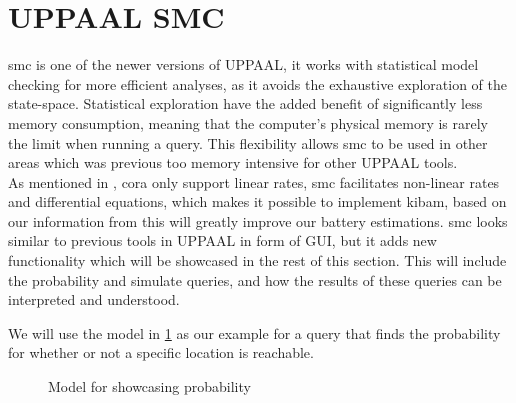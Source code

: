 \section{UPPAAL SMC} \label{sec:smc}
\gls{smc} is one of the newer versions of UPPAAL, it works with statistical model checking for more efficient analyses, as it avoids the exhaustive exploration of the state-space.
Statistical exploration have the added benefit of significantly less memory consumption, meaning that the computer's physical memory is rarely the limit when running a query.
This flexibility allows \gls{smc} to be used in other areas which was previous too memory intensive for other UPPAAL tools\cite{cs_smc}.\\
As mentioned in , \gls{cora} only support linear rates, \gls{smc} facilitates non-linear rates and differential equations, which makes it possible to implement \gls{kibam}, based on our information from  this will greatly improve our battery estimations.
\gls{smc} looks similar to previous tools in UPPAAL in form of GUI, but it adds new functionality which will be showcased in the rest of this section.
This will include the probability and simulate queries, and how the results of these queries can be interpreted and understood.

We will use the model in \cref{fig:example} as our example for a query that finds the probability for whether or not a specific location is reachable.
\begin{figure}[H]
	\centering
	\caption{Model for showcasing probability}
	\label{fig:example}
\end{figure}

